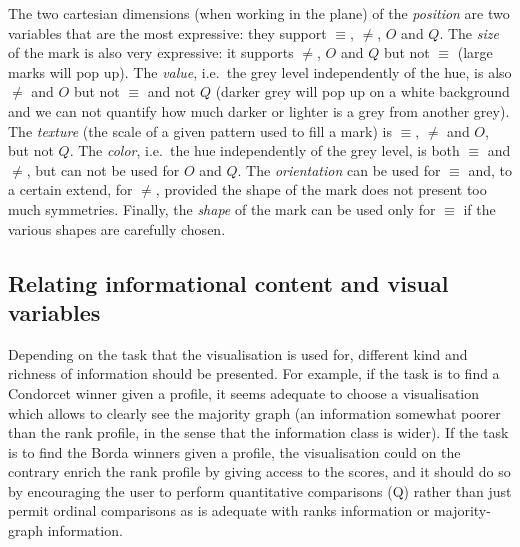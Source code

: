 \documentclass[version=last, pagesize, twoside=off, bibliography=totoc, DIV=calc, fontsize=12pt, a4paper, french, english]{scrartcl}
\begin{document}
The two cartesian dimensions (when working in the plane) of the \emph{position} are two variables that are the most expressive: they support $\equiv$, $\neq$, $O$ and $Q$.
The \emph{size} of the mark is also very expressive: it supports $\neq$, $O$ and $Q$ but not $\equiv$ (large marks will pop up).
The \emph{value}, i.e.\ the grey level independently of the hue, is also $\neq$ and $O$ but not $\equiv$ and not $Q$ (darker grey will pop up on a white background and we can not quantify how much darker or lighter is a grey from another grey).
The \emph{texture} (the scale of a given pattern used to fill a mark) is $\equiv$, $\neq$ and $O$, but not $Q$.
The \emph{color}, i.e.\ the hue independently of the grey level, is both $\equiv$ and $\neq$, but can not be used for $O$ and $Q$.
The \emph{orientation} can be used for $\equiv$ and, to a certain extend, for $\neq$, provided the shape of the mark does not present too much symmetries.
Finally, the \emph{shape} of the mark can be used only for $\equiv$ if the various shapes are carefully chosen.

\subsection{Relating informational content and visual variables}
Depending on the task that the visualisation is used for, different kind and richness of information should be presented. For example, if the task is to find a Condorcet winner given a profile, it seems adequate to choose a visualisation which allows to clearly see the majority graph (an information somewhat poorer than the rank profile, in the sense that the information class is wider). If the task is to find the Borda winners given a profile, the visualisation could on the contrary enrich the rank profile by giving access to the scores, and it should do so by encouraging the user to perform quantitative comparisons (Q) rather than just permit ordinal comparisons as is adequate with ranks information or majority-graph information.
\end{document}
